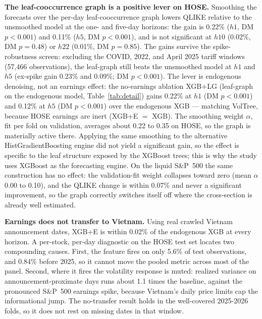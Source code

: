 \documentclass[runningheads]{llncs}
\begin{document}
\textbf{The leaf-cooccurrence graph is a positive lever on HOSE.} Smoothing the forecasts over the
per-day leaf-cooccurrence graph lowers QLIKE relative to the unsmoothed model at the one- and five-day
horizons: the gain is 0.22\% ($h1$, DM $p<0.001$) and 0.11\% ($h5$, DM $p<0.001$), and is not
significant at $h10$ (0.02\%, DM $p=0.48$) or $h22$ (0.01\%, DM $p=0.85$).
The gains survive the spike-robustness screen: excluding the COVID, 2022, and April 2025 tariff windows
(57{,}466 observations), the leaf-graph still beats the unsmoothed model at $h1$ and $h5$
(ex-spike gain 0.23\% and 0.09\%; DM $p<0.001$).
The lever is endogenous denoising, not an earnings effect: the no-earnings ablation XGB+LG (leaf-graph on
the endogenous model, Table~\ref{tab:detail}) gains 0.22\% at $h1$ (DM $p<0.001$) and 0.12\% at $h5$
(DM $p<0.001$) over the endogenous XGB --- matching VolTree, because HOSE earnings are inert (XGB+E $=$ XGB).
The smoothing weight $\alpha$, fit per fold on validation, averages about 0.22 to 0.35 on HOSE, so the
graph is materially active there. Applying the same smoothing to the alternative HistGradientBoosting
engine did not yield a significant gain, so the effect is specific to the leaf structure exposed by the
XGBoost trees; this is why the study uses XGBoost as the forecasting engine. On the liquid S\&P~500 the
same construction has no effect: the validation-fit weight collapses toward zero (mean $\alpha$ 0.00 to
0.10), and the QLIKE change is within 0.07\% and never a significant improvement, so the graph
correctly switches itself off where the cross-section is already well estimated.

\textbf{Earnings does not transfer to Vietnam.} Using real crawled Vietnam announcement dates, XGB+E is
within 0.02\% of the endogenous XGB at every horizon. A per-stock, per-day diagnostic on the HOSE
test set locates two compounding causes. First, the feature fires on only 5.6\% of test observations,
and 0.84\% before 2025, so it cannot move the pooled metric across most of the panel. Second, where it
fires the volatility response is muted: realized variance on announcement-proximate days runs about
1.1 times the baseline, against the pronounced S\&P~500 earnings spike, because Vietnam's daily price
limits cap the informational jump. The no-transfer result holds in the well-covered 2025-2026 folds,
so it does not rest on missing dates in that window.
\end{document}
